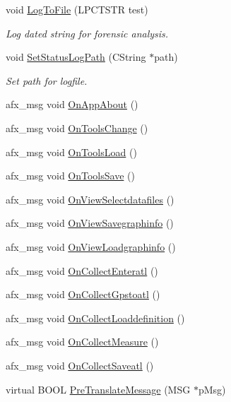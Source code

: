 \begin{DoxyCompactItemize}
void \hyperlink{classCspec4App_acf22826dc5bf4e8f86eed616a75af9c7}{LogToFile} (LPCTSTR test)
\begin{DoxyCompactList}\small\item\em Log dated string for forensic analysis. \item\end{DoxyCompactList}\item 
void \hyperlink{classCspec4App_af33cc5b73a8cd977ff28aa3accdb3960}{SetStatusLogPath} (CString $\ast$path)
\begin{DoxyCompactList}\small\item\em Set path for logfile. \item\end{DoxyCompactList}\item 
afx\_\-msg void \hyperlink{classCspec4App_ab2d99fa293b43c34530e32147bf038e9}{OnAppAbout} ()
\item 
afx\_\-msg void \hyperlink{classCspec4App_a08b6939770960558c59355c96bbd3a8c}{OnToolsChange} ()
\item 
afx\_\-msg void \hyperlink{classCspec4App_ac4ac00643edc858cef466c4d153fd068}{OnToolsLoad} ()
\item 
afx\_\-msg void \hyperlink{classCspec4App_a4bbbf33c32a87a51d9bdd84b70a0727d}{OnToolsSave} ()
\item 
afx\_\-msg void \hyperlink{classCspec4App_a40d57a216d05be7fcf305f7d04d24c1b}{OnViewSelectdatafiles} ()
\item 
afx\_\-msg void \hyperlink{classCspec4App_afa6fe4a881aec12e5c448cedebbbcc15}{OnViewSavegraphinfo} ()
\item 
afx\_\-msg void \hyperlink{classCspec4App_af5b874e8813fc3d8f7602b32bb5404e5}{OnViewLoadgraphinfo} ()
\item 
afx\_\-msg void \hyperlink{classCspec4App_a8d7abc6cf7f0335b270508b363a16bef}{OnCollectEnteratl} ()
\item 
afx\_\-msg void \hyperlink{classCspec4App_a5c60d3dcd009a20cf33d4a946a204d7e}{OnCollectGpstoatl} ()
\item 
afx\_\-msg void \hyperlink{classCspec4App_a18f178fb45acfb9aaef0e997f90a6801}{OnCollectLoaddefinition} ()
\item 
afx\_\-msg void \hyperlink{classCspec4App_a0251910c81d58c03566f06419369f85a}{OnCollectMeasure} ()
\item 
afx\_\-msg void \hyperlink{classCspec4App_a969b519374e9d76d7d57b201e6dd159b}{OnCollectSaveatl} ()
\item 
virtual BOOL \hyperlink{classCspec4App_a835e26ca3a61c34c381668f0cfcee205}{PreTranslateMessage} (MSG $\ast$pMsg)
\end{DoxyCompactItemize}
